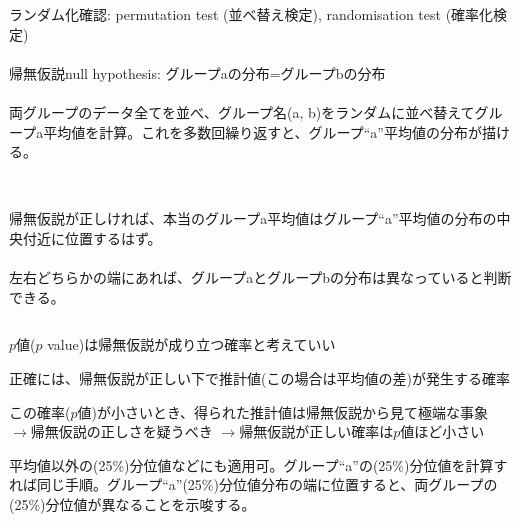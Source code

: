 \begin{frame}{}
ランダム化確認: permutation test (並べ替え検定), randomisation test (確率化検定)\\~\\
\pause
帰無仮説null hypothesis: グループaの分布=グループbの分布\\~\\
\pause
両グループのデータ全てを並べ、グループ名(a, b)をランダムに並べ替えてグループa平均値を計算。これを多数回繰り返すと、グループ``a''平均値の分布が描ける。\\~\\
\begin{columns}[T]
\column{.475\paperwidth}
\pause
帰無仮説が正しければ、本当のグループa平均値はグループ``a''平均値の分布の中央付近に位置するはず。\\~\\
\column{.475\paperwidth}
\pause
左右どちらかの端にあれば、グループaとグループbの分布は異なっていると判断できる。
\end{columns}
\pause
\begin{dinglist}{45}
\vspace{1.0ex}\setlength{\itemsep}{1.0ex}\setlength{\baselineskip}{12pt}
\item	$p$値($p$ value)は帰無仮説が成り立つ確率と考えていい
	\begin{dinglist}{43}\footnotesize
	\vspace{1.0ex}\setlength{\itemsep}{1.0ex}\setlength{\baselineskip}{10pt}
	\pause
	\item	正確には、帰無仮説が正しい下で推計値(この場合は平均値の差)が発生する確率
	\pause
	\item	この確率($p$値)が小さいとき、得られた推計値は帰無仮説から見て極端な事象\pause
	$\rightarrow$帰無仮説の正しさを疑うべき\pause
	$\rightarrow$帰無仮説が正しい確率は$p$値ほど小さい\\[2ex]
	\end{dinglist}
\end{dinglist}
\pause
平均値以外の(25\%)分位値などにも適用可。グループ``a''の(25\%)分位値を計算すれば同じ手順。グループ``a''(25\%)分位値分布の端に位置すると、両グループの(25\%)分位値が異なることを示唆する。
\end{frame}
